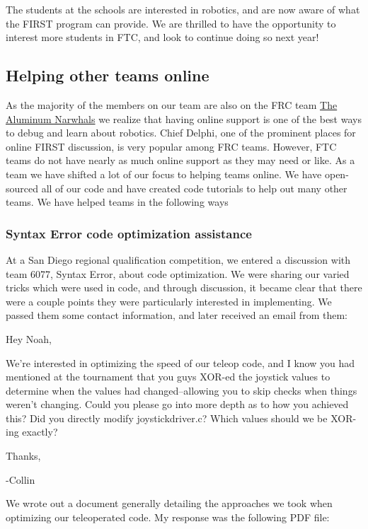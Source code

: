 The students at the schools are interested in robotics, and are now aware of what the FIRST program can provide. We are thrilled to have the opportunity to interest more students in FTC, and look to continue doing so next year!

\subsection{Helping other teams online}
As the majority of the members on our team are also on the FRC team \underline{The Aluminum Narwhals} we realize that having online support is one of the best ways to debug and learn about robotics. Chief Delphi, one of the prominent places for online FIRST discussion, is very popular among FRC teams. However, FTC teams do not have nearly as much online support as they may need or like. As a team we have shifted a lot of our focus to helping teams online. We have open-sourced all of our code and have created code tutorials to help out many other teams. We have helped teams in the following ways

\subsubsection{Syntax Error code optimization assistance}

At a San Diego regional qualification competition, we entered a discussion with team 6077, Syntax Error, about code optimization. We were sharing our varied tricks which were used in code, and through discussion, it became clear that there were a couple points they were particularly interested in implementing. We passed them some contact information, and later received an email from them:

\begin{fancyquotes}
Hey Noah,

We're interested in optimizing the speed of our teleop code, and I know you had mentioned at the tournament that you guys XOR-ed the joystick values to determine when the values had changed--allowing you to skip checks when things weren't changing. Could you please go into more depth as to how you achieved this? Did you directly modify joystickdriver.c? Which values should we be XOR-ing exactly?

Thanks,

-Collin 
\end{fancyquotes}

We wrote out a document generally detailing the approaches we took when optimizing our teleoperated code. My response was the following PDF file:


